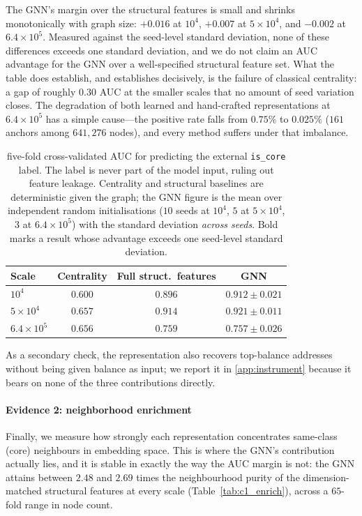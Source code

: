 \documentclass[final,5p,times]{elsarticle}
\begin{document}
The GNN's margin over the structural features is small and shrinks
monotonically with graph size: $+0.016$ at $10^4$, $+0.007$ at
$5\times10^4$, and $-0.002$ at $6.4\times10^5$. Measured against the
seed-level standard deviation, none of these differences exceeds one
standard deviation, and we do not claim an AUC advantage for the GNN over a
well-specified structural feature set. What the table does establish, and
establishes decisively, is the failure of classical centrality: a gap of
roughly $0.30$ AUC at the smaller scales that no amount of seed variation
closes. The degradation of both learned and hand-crafted representations at
$6.4\times10^5$ has a simple cause---the positive rate falls from $0.75\%$
to $0.025\%$ ($161$ anchors among $641{,}276$ nodes), and every method
suffers under that imbalance.

\begin{table}[H]
\centering\small
\caption{five-fold cross-validated AUC for predicting the
external \texttt{is\_core} label. The label is never part of the model
input, ruling out feature leakage. Centrality and structural baselines are
deterministic given the graph; the GNN figure is the mean over independent
random initialisations ($10$ seeds at $10^4$, $5$ at $5\times10^4$, $3$ at
$6.4\times10^5$) with the standard deviation \emph{across seeds}. Bold marks
a result whose advantage exceeds one seed-level standard deviation.}
\label{tab:c1_iscore}
\begin{tabular}{lccc}
\toprule
Scale & Centrality & Full struct.\ features & \textbf{GNN} \\
\midrule
$10^4$            & $0.600$ & $0.896$ & $\mathbf{0.912 \pm 0.021}$ \\
$5\times10^4$     & $0.657$ & $0.914$ & $\mathbf{0.921 \pm 0.011}$ \\
$6.4\times10^5$   & $0.656$ & $0.759$ & $0.757 \pm 0.026$ \\
\bottomrule
\end{tabular}
\end{table}



As a secondary check, the representation also recovers top-balance addresses
without being given balance as input; we report it in
\ref{app:instrument} because it bears on none of the three
contributions directly.

\paragraph{Evidence 2: neighborhood enrichment}
Finally, we measure how strongly each representation concentrates
same-class (core) neighbours in embedding space. This is where the GNN's
contribution actually lies, and it is stable in exactly the way the AUC
margin is not: the GNN attains between $2.48$ and $2.69$ times the
neighbourhood purity of the dimension-matched structural features at every
scale (Table~\ref{tab:c1_enrich}), across a $65$-fold range in node count.
\end{document}
